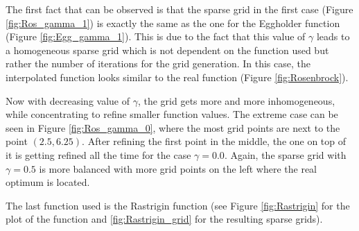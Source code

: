 The first fact that can be observed is that the sparse grid in the first case (Figure \ref{fig:Ros_gamma_1}) is exactly the same as the one for the Eggholder function (Figure \ref{fig:Egg_gamma_1}). This is due to the fact that this value of $ \gamma $ leads to a homogeneous sparse grid which is not dependent on the function used but rather the number of iterations for the grid generation. In this case, the interpolated function looks similar to the real function (Figure \ref{fig:Rosenbrock}). 

Now with decreasing value of $ \gamma $, the grid gets more and more inhomogeneous, while concentrating to refine smaller function values. The extreme case can be seen in Figure \ref{fig:Ros_gamma_0}, where the most grid points are next to the point $ (2.5, 6.25) $. After refining the first point in the middle, the one on top of it is getting refined all the time for the case $ \gamma = 0.0 $. Again, the sparse grid with $ \gamma = 0.5 $ is more balanced with more grid points on the left where the real optimum is located. \newline 


The last function used is the Rastrigin function (see Figure \ref{fig:Rastrigin} for the plot of the function and \ref{fig:Rastrigin_grid} for the resulting sparse grids). 

